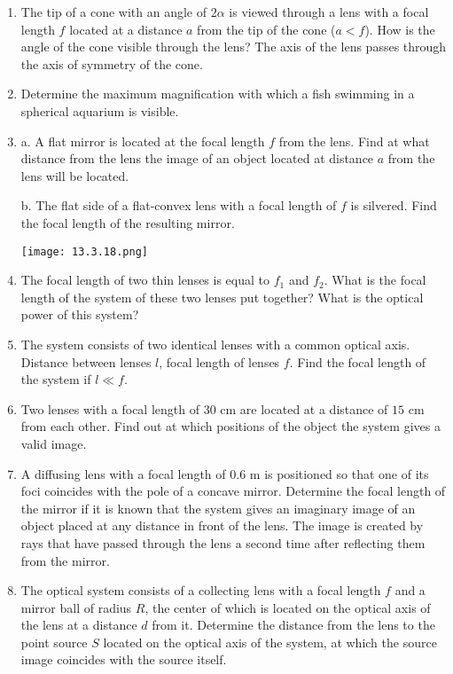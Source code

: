 \documentclass{article}
\begin{document}
\begin{enumerate}[label=13.3.\arabic*]
\item The tip of a cone with an angle of $2 \alpha$ is viewed through a lens with a focal length $f$ located at a distance $a$ from the tip of the cone ($a < f$). How is the angle of the cone visible through the lens? The axis of the lens passes through the axis of symmetry of the cone.

\item Determine the maximum magnification with which a fish swimming in a spherical aquarium is visible.

\item a. A flat mirror is located at the focal length $f$ from the lens. Find at what distance from the lens the image of an object located at distance $a$ from the lens will be located.

b. The flat side of a flat-convex lens with a focal length of $f$ is silvered. Find the focal length of the resulting mirror.

\begin{center}
    \texttt{[image: 13.3.18.png]}
\end{center}

\item The focal length of two thin lenses is equal to $f_1$ and $f_2$. What is the focal length of the system of these two lenses put together? What is the optical power of this system?

\item The system consists of two identical lenses with a common optical axis. Distance between lenses $l$, focal length of lenses $f$. Find the focal length of the system if $l \ll f$.

\item Two lenses with a focal length of $30$ cm are located at a distance of $15$ cm from each other. Find out at which positions of the object the system gives a valid image.

\item A diffusing lens with a focal length of $0.6$ m is positioned so that one of its foci coincides with the pole of a concave mirror. Determine the focal length of the mirror if it is known that the system gives an imaginary image of an object placed at any distance in front of the lens. The image is created by rays that have passed through the lens a second time after reflecting them from the mirror.

\item The optical system consists of a collecting lens with a focal length $f$ and a mirror ball of radius $R$, the center of which is located on the optical axis of the lens at a distance $d$ from it. Determine the distance from the lens to the point source $S$ located on the optical axis of the system, at which the source image coincides with the source itself.


\end{enumerate}
\end{document}
